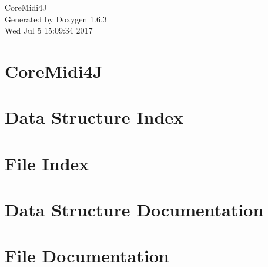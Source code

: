 \documentclass[a4paper]{book}
\begin{document}
\hypersetup{pageanchor=false}
\begin{titlepage}
\vspace*{7cm}
\begin{center}
{\Large CoreMidi4J }\\
\vspace*{1cm}
{\large Generated by Doxygen 1.6.3}\\
\vspace*{0.5cm}
{\small Wed Jul 5 15:09:34 2017}\\
\end{center}
\end{titlepage}
\clearemptydoublepage
{}
\tableofcontents
\clearemptydoublepage
{}
\hypersetup{pageanchor=true}
\chapter{CoreMidi4J}
\label{index}\hypertarget{index}{}
\chapter{Data Structure Index}

\chapter{File Index}

\chapter{Data Structure Documentation}

\chapter{File Documentation}
















\printindex
\end{document}

